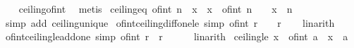 \begin{isabellebody}
%
\isadelimproof
\ \ %
\endisadelimproof
%
\isatagproof
{}\isamarkupfalse%
\ ceiling{\isacharunderscore}{\kern0pt}of{\isacharunderscore}{\kern0pt}int\ \isamarkupfalse%
\ metis%
\endisatagproof
{\isafoldproof}%
%
\isadelimproof
\isanewline
%
\endisadelimproof
\isanewline
{}\isamarkupfalse%
\ ceiling{\isacharunderscore}{\kern0pt}eq{\isacharcolon}{\kern0pt}\ {\isachardoublequoteopen}of{\isacharunderscore}{\kern0pt}int\ n\ {\isacharless}{\kern0pt}\ x\ {\isasymLongrightarrow}\ x\ {\isasymle}\ of{\isacharunderscore}{\kern0pt}int\ n\ {\isacharplus}{\kern0pt}\ {}\ {\isasymLongrightarrow}\ {\isasymlceil}x{\isasymrceil}\ {\isacharequal}{\kern0pt}\ n\ {\isacharplus}{\kern0pt}\ {}{\isachardoublequoteclose}\isanewline
%
\isadelimproof
\ \ %
\endisadelimproof
%
\isatagproof
{}\isamarkupfalse%
\ {\isacharparenleft}{\kern0pt}simp\ add{\isacharcolon}{\kern0pt}\ ceiling{\isacharunderscore}{\kern0pt}unique{\isacharparenright}{\kern0pt}%
\endisatagproof
{\isafoldproof}%
%
\isadelimproof
\isanewline
%
\endisadelimproof
\isanewline
{}\isamarkupfalse%
\ of{\isacharunderscore}{\kern0pt}int{\isacharunderscore}{\kern0pt}ceiling{\isacharunderscore}{\kern0pt}diff{\isacharunderscore}{\kern0pt}one{\isacharunderscore}{\kern0pt}le\ {\isacharbrackleft}{\kern0pt}simp{\isacharbrackright}{\kern0pt}{\isacharcolon}{\kern0pt}\ {\isachardoublequoteopen}of{\isacharunderscore}{\kern0pt}int\ {\isasymlceil}r{\isasymrceil}\ {\isacharminus}{\kern0pt}\ {}\ {\isasymle}\ r{\isachardoublequoteclose}\isanewline
%
\isadelimproof
\ \ %
\endisadelimproof
%
\isatagproof
{}\isamarkupfalse%
\ linarith%
\endisatagproof
{\isafoldproof}%
%
\isadelimproof
\isanewline
%
\endisadelimproof
\isanewline
{}\isamarkupfalse%
\ of{\isacharunderscore}{\kern0pt}int{\isacharunderscore}{\kern0pt}ceiling{\isacharunderscore}{\kern0pt}le{\isacharunderscore}{\kern0pt}add{\isacharunderscore}{\kern0pt}one\ {\isacharbrackleft}{\kern0pt}simp{\isacharbrackright}{\kern0pt}{\isacharcolon}{\kern0pt}\ {\isachardoublequoteopen}of{\isacharunderscore}{\kern0pt}int\ {\isasymlceil}r{\isasymrceil}\ {\isasymle}\ r\ {\isacharplus}{\kern0pt}\ {}{\isachardoublequoteclose}\isanewline
%
\isadelimproof
\ \ %
\endisadelimproof
%
\isatagproof
{}\isamarkupfalse%
\ linarith%
\endisatagproof
{\isafoldproof}%
%
\isadelimproof
\isanewline
%
\endisadelimproof
\isanewline
{}\isamarkupfalse%
\ ceiling{\isacharunderscore}{\kern0pt}le{\isacharcolon}{\kern0pt}\ {\isachardoublequoteopen}x\ {\isasymle}\ of{\isacharunderscore}{\kern0pt}int\ a\ {\isasymLongrightarrow}\ {\isasymlceil}x{\isasymrceil}\ {\isasymle}\ a{\isachardoublequoteclose}\isanewline

\end{isabellebody}
